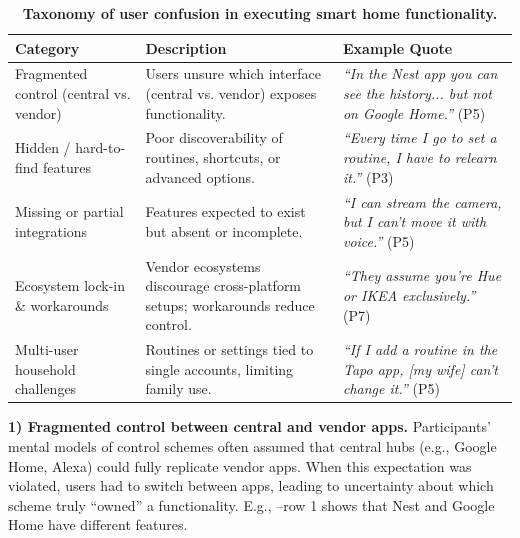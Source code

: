 \renewcommand{\arraystretch}{1.2}
\begin{table}[t]
    \centering
    \caption{\bf \small Taxonomy of user confusion in executing smart home functionality.}
    \bigskip
    \label{cic:tab:confusion}
    \footnotesize
    \begin{tabular}{R{3.4cm}|p{5.8cm}|p{6cm}}
        \hline
        \textbf{Category} & \textbf{Description} & \textbf{Example Quote} \\
        \hline\hline
        Fragmented control (central vs. vendor)
        & Users unsure which interface (central vs. vendor) exposes functionality. 
        & \textit{``In the Nest app you can see the history... but not on Google Home.''} (P5) \\
        \hline

        Hidden / hard-to-find features
        & Poor discoverability of routines, shortcuts, or advanced options. 
        & \textit{``Every time I go to set a routine, I have to relearn it.''} (P3) \\
        \hline

        Missing or partial integrations
        & Features expected to exist but absent or incomplete. 
        & \textit{``I can stream the camera, but I can't move it with voice.''} (P5) \\
        \hline

        \raggedleft Ecosystem lock-in \& workarounds
        & \raggedright Vendor ecosystems discourage cross-platform setups; workarounds reduce control. 
        & \textit{``They assume you're Hue or IKEA exclusively.''} (P7) \\
        \hline

        Multi-user household challenges
        & Routines or settings tied to single accounts, limiting family use. 
        & \textit{``If I add a routine in the Tapo app, [my wife] can't change it.''} (P5) \\
        \hline
    \end{tabular}
\end{table}

\noindent\textbf{1) Fragmented control between central and vendor apps.}  
Participants' mental models of control schemes often assumed that central hubs (e.g., Google Home, Alexa) could fully replicate vendor apps. When this expectation was violated, users had to switch between apps, leading to uncertainty about which scheme truly ``owned'' a functionality. E.g., --row 1 shows that Nest and Google Home have different features. 

